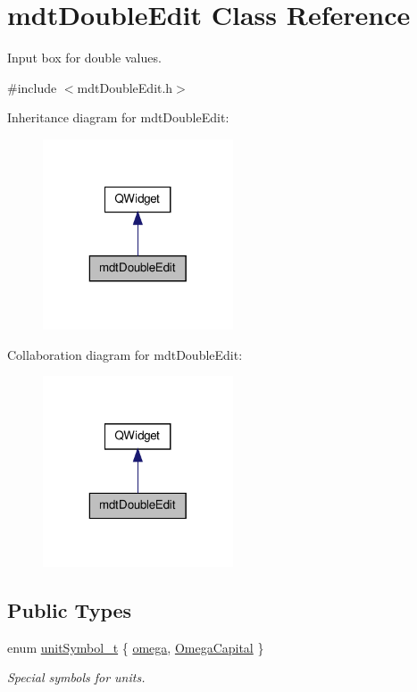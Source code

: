 \hypertarget{classmdt_double_edit}{\section{mdt\-Double\-Edit Class Reference}
\label{classmdt_double_edit}
}


Input box for double values.  




{\ttfamily \#include $<$mdt\-Double\-Edit.\-h$>$}



Inheritance diagram for mdt\-Double\-Edit\-:\nopagebreak
\begin{figure}[H]
\begin{center}
\leavevmode
\includegraphics[width=160pt]{classmdt_double_edit__inherit__graph}
\end{center}
\end{figure}


Collaboration diagram for mdt\-Double\-Edit\-:\nopagebreak
\begin{figure}[H]
\begin{center}
\leavevmode
\includegraphics[width=160pt]{classmdt_double_edit__coll__graph}
\end{center}
\end{figure}
\subsection*{Public Types}
\begin{DoxyCompactItemize}
\item 
enum \hyperlink{classmdt_double_edit_a6e94cba2a7b3fcc16b70475c2cefd8cf}{unit\-Symbol\-\_\-t} \{ \hyperlink{classmdt_double_edit_a6e94cba2a7b3fcc16b70475c2cefd8cfaaeecc523af2a2eba97a3b1a38f4518c5}{omega}, 
\hyperlink{classmdt_double_edit_a6e94cba2a7b3fcc16b70475c2cefd8cfadad86fae09055324dd22fc15e6107fe0}{Omega\-Capital}
 \}
\begin{DoxyCompactList}\small\item\em Special symbols for units. \end{DoxyCompactList}\end{DoxyCompactItemize}
